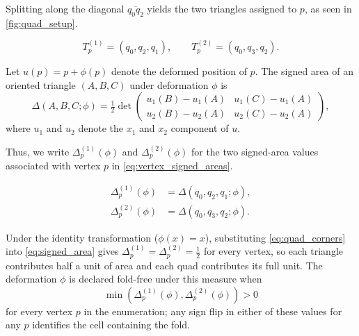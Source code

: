 Splitting along the diagonal $\overline{q_0 q_2}$ yields the two triangles assigned to $p$, as seen in \autoref{fig:quad_setup}.

\begin{equation} \label{eq:vertex_triangles}
    T^{(1)}_p = (q_0, q_2, q_1), \qquad T^{(2)}_p = (q_0, q_3, q_2).
\end{equation}

Let $u(p) = p + \phi(p)$ denote the deformed position of $p$. The signed area of an oriented triangle $(A, B, C)$ under deformation $\phi$ is
\begin{equation} \label{eq:signed_area}
    \Delta(A, B, C; \phi) = \tfrac{1}{2} \det\begin{pmatrix}
        u_1(B) - u_1(A) & u_1(C) - u_1(A) \\
        u_2(B) - u_2(A) & u_2(C) - u_2(A)
    \end{pmatrix},
\end{equation}
where $u_1$ and $u_2$ denote the $x_1$ and $x_2$ component of $u$. 

Thus, we write $\Delta^{(1)}_p(\phi)$ and $\Delta^{(2)}_p(\phi)$ for the two signed-area values associated with vertex $p$ in \autoref{eq:vertex_signed_areas}.

\begin{equation} \label{eq:vertex_signed_areas}
    \begin{aligned}
        \Delta^{(1)}_p(\phi) &= \Delta(q_0, q_2, q_1; \phi), \\
        \Delta^{(2)}_p(\phi) &= \Delta(q_0, q_3, q_2; \phi).
    \end{aligned}
\end{equation}

Under the identity transformation ($\phi(x) = x$), substituting \autoref{eq:quad_corners} into \autoref{eq:signed_area} gives $\Delta^{(1)}_p = \Delta^{(2)}_p = \tfrac{1}{2}$ for every vertex, so each triangle contributes half a unit of area and each quad contributes its full unit. The deformation $\phi$ is declared fold-free under this measure when $$\min(\Delta^{(1)}_p(\phi), \Delta^{(2)}_p(\phi)) > 0$$ for every vertex $p$ in the enumeration; any sign flip in either of these values for any $p$ identifies the cell containing the fold.

